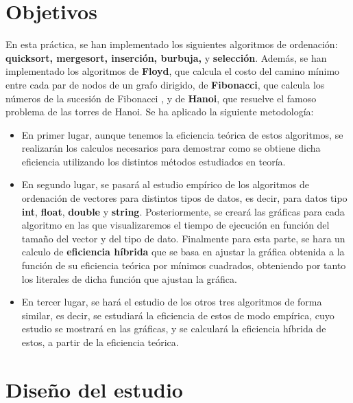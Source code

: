 \documentclass[11pt]{article}
\begin{document}
\section{Objetivos}
    En esta práctica, se han implementado los siguientes algoritmos de ordenación: \textbf{quicksort, mergesort, inserción, burbuja,}
    y \textbf{selección}. Además, se han implementado los algoritmos de \textbf{Floyd}, que calcula el costo del camino mínimo entre cada par de nodos 
    de un grafo dirigido, de \textbf{Fibonacci}, que calcula los números de la sucesión de Fibonacci , y de \textbf{Hanoi}, que resuelve el famoso 
    problema de las torres de Hanoi. Se ha aplicado la siguiente metodología:
    \begin{itemize}
        \item En primer lugar, aunque tenemos la eficiencia teórica de estos algoritmos, se realizarán los calculos necesarios para demostrar
        como se obtiene dicha eficiencia utilizando los distintos métodos estudiados en teoría. \\
        
        \item En segundo lugar, se pasará al estudio empírico de los algoritmos de ordenación de vectores para distintos tipos de datos, es decir, 
        para datos tipo \textbf{int}, \textbf{float}, \textbf{double} y \textbf{string}. Posteriormente, se creará las gráficas para
        cada algoritmo en las que visualizaremos el tiempo de ejecución en función del tamaño del vector y del tipo de dato. Finalmente 
        para esta parte, se hara un calculo de \textbf{eficiencia híbrida} que se basa en ajustar la gráfica obtenida a la función de su eficiencia
        teórica por mínimos cuadrados, obteniendo por tanto los literales de dicha función que ajustan la gráfica.\\
        
        \item En tercer lugar, se hará el estudio de los otros tres algoritmos de forma similar, es decir, se estudiará la eficiencia
        de estos de modo empírica, cuyo estudio se mostrará en las gráficas, y se calculará la eficiencia híbrida de estos, a partir
        de la eficiencia teórica.\\     
    \end{itemize}
\section{Diseño del estudio}
\end{document}
